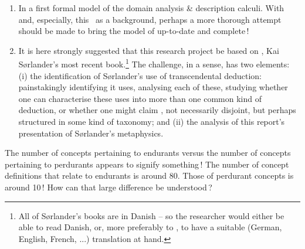 \begin{enumerate}
\mnewfoil
  \item \label{rp:Formal Models}  In \cite{bjorner-jaist-2014}  a
      first formal model of the domain analysis \& description calculi.
      With  \cite{BjornerMonograph2020} and, especially, this \primer\
      as a background, perhaps a more thorough attempt should be made to
      bring the model of \cite{bjorner-jaist-2014} up-to-date and complete\,! 
\mnewfoil
\item \label{rp:filosofi}   It is here strongly
    suggested that this research project be based on
    \cite{kaisorlander2022}, Kai S{\o}rlander's most recent
    book.\footnote{All of S{\o}rlander's books
    \cite[1994--2022]{kaisorlander1994,kaisorlander1997,kaisorlander2002,kaisorlander2016,kaisorlander2022} 
    are in Danish -- so the researcher would either be able to read
    Danish, or, more preferably to \ysfchgv{us}, to have a suitable (German,
    English, French, ...) translation at hand.} 
    The challenge, in a sense, has two elements: (i) the
    identification of S{\o}rlander's use of \textsf{transcendental
    deduction}: painstakingly identifying \sort{all} it uses,
    analysing each of these, studying whether one can characterise
    these uses into more than one common kind of deduction, or whether
    one might claim \sfsl{``classes of deductions''}, not necessarily
    disjoint, but perhaps structured in some kind of taxonomy; and
    (ii) the analysis of this report's presentation of S{\o}rlander's
    metaphysics.
\end{enumerate}
\afslut



\eysf



\begynd
\pind The number of concepts pertaining to endurants versus the number
      of concepts pertaining to perdurants appears to signify something\,!
\begynd
\pind The number of concept definitions that relate to endurants is around 80.
\pind Those of perdurant concepts is around 10\,!
\pind How can that large difference be understood\,?
\afslut
\afslut


